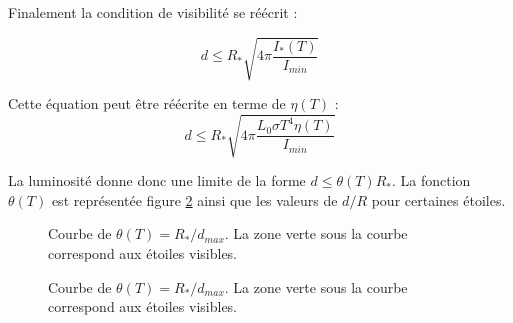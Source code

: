 \documentclass[11pt]{article} %
\begin{document}
Finalement la condition de visibilité se réécrit :

\begin{equation}
 d \leq R_{*} \sqrt{4\pi\dfrac{I_*(T)}{I_{min}}}
\end{equation}

Cette équation peut être réécrite en terme de $\eta(T)$ :
\begin{equation}
 d \leq R_{*} \sqrt{4\pi\dfrac{L_0 \sigma T^4 \eta(T)}{I_{min}}}
\end{equation}

La luminosité donne donc une limite de la forme $d \leq \theta (T) R_*$. La fonction $\theta(T)$ est représentée figure \ref{fig:theta} ainsi que les valeurs de $d/R$ pour certaines étoiles. 

\begin{figure}[H]
\centering
  \caption{Courbe de $\theta(T) =  R_* /d_{max}$. La zone verte sous la courbe correspond aux étoiles visibles.  
\label{fig:theta}}

\end{figure}


\begin{figure}[H]
\centering
  \caption{Courbe de $\theta(T) =  R_* /d_{max}$. La zone verte sous la courbe correspond aux étoiles visibles.  
\label{fig:theta}}

\end{figure}

%
%
\end{document}
